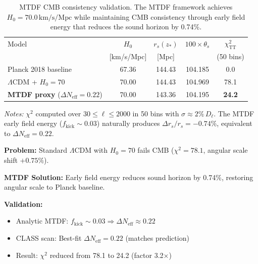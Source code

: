 
\begin{table}[h]
\centering
\caption{MTDF CMB consistency validation. The MTDF framework achieves
$H_0 = 70.0\,\mathrm{km/s/Mpc}$ while maintaining CMB consistency through
early field energy that reduces the sound horizon by 0.74\%.}
\label{tab:cmb_summary}
\begin{tabular}{lcccc}
\hline\hline
Model & $H_0$ & $r_s(z_*)$ & $100\times\theta_s$ & $\chi^2_\mathrm{TT}$ \\
      & [km/s/Mpc] & [Mpc] & & (50 bins) \\
\hline
Planck 2018 baseline & 67.36 & 144.43 & 104.185 & 0.0 \\
$\Lambda$CDM + $H_0=70$ & 70.00 & 144.43 & 104.969 & 78.1 \\
\textbf{MTDF proxy} ($\Delta N_\mathrm{eff}=0.22$) & 70.00 & 143.36 & 104.195 & \textbf{24.2} \\
\hline\hline
\end{tabular}

\vspace{0.5em}
\footnotesize
\textit{Notes:} $\chi^2$ computed over $30 \leq \ell \leq 2000$ in 50 bins
with $\sigma \approx 2\%\,D_\ell$. The MTDF early field energy
($f_\mathrm{kick} \sim 0.03$) naturally produces $\Delta r_s/r_s = -0.74\%$,
equivalent to $\Delta N_\mathrm{eff} = 0.22$.
\end{table}

\begin{tcolorbox}[colback=blue!5!white, colframe=blue!50!black,
                  title=\textbf{CMB Consistency Summary}]
\textbf{Problem:} Standard $\Lambda$CDM with $H_0 = 70$ fails CMB
($\chi^2 = 78.1$, angular scale shift $+0.75\%$).

\textbf{MTDF Solution:} Early field energy reduces sound horizon by 0.74\%,
restoring angular scale to Planck baseline.

\textbf{Validation:}
\begin{itemize}[nosep, leftmargin=*]
  \item Analytic MTDF: $f_\mathrm{kick} \sim 0.03 \Rightarrow
        \Delta N_\mathrm{eff} \approx 0.22$
  \item CLASS scan: Best-fit $\Delta N_\mathrm{eff} = 0.22$
        (matches prediction)
  \item Result: $\chi^2$ reduced from 78.1 to 24.2 (factor 3.2$\times$)
\end{itemize}
\end{tcolorbox}

